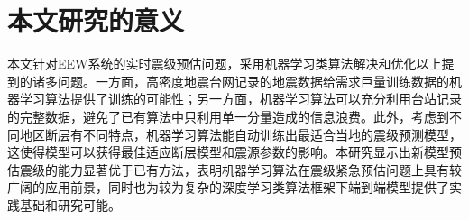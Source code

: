    \section{本文研究的意义}
\indent 本文针对EEW系统的实时震级预估问题，采用机器学习类算法解决和优化以上提到的诸多问题。一方面，高密度地震台网记录的地震数据给需求巨量训练数据的机器学习算法提供了训练的可能性；另一方面，机器学习算法可以充分利用台站记录的完整数据，避免了已有算法中只利用单一分量造成的信息浪费。此外，考虑到不同地区断层有不同特点，机器学习算法能自动训练出最适合当地的震级预测模型，这使得模型可以获得最佳适应断层模型和震源参数的影响。本研究显示出新模型预估震级的能力显著优于已有方法，表明机器学习算法在震级紧急预估问题上具有较广阔的应用前景，同时也为较为复杂的深度学习类算法框架下端到端模型提供了实践基础和研究可能。

